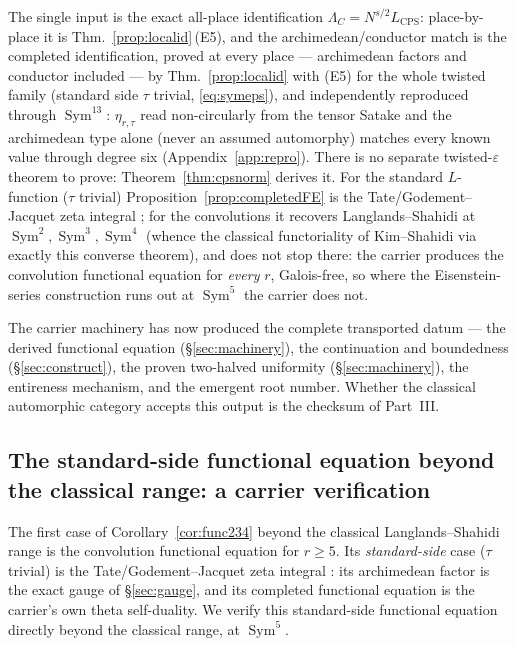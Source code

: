 \documentclass[11pt]{article}
\theoremstyle{definition}
\newcommand{\Sym}{\operatorname{Sym}}
\begin{document}
\noindent The single input is the exact all-place identification $\Lambda_C=N^{s/2}L_{\mathrm{CPS}}$: place-by-place
it is Thm.~\ref{prop:localid}\,(E5), and the archimedean/conductor match is the completed identification, proved
at every place --- archimedean factors and conductor included --- by Thm.~\ref{prop:localid} with (E5) for the
whole twisted family (standard side $\tau$ trivial, \eqref{eq:symeps}), and independently reproduced through
$\Sym^{13}$: $\eta_{r,\tau}$ read non-circularly from the tensor Satake and the archimedean type
alone (never an assumed automorphy) matches every known value through degree six (Appendix~\ref{app:repro}). There is no separate twisted-$\varepsilon$ theorem to prove:
Theorem~\ref{thm:cpsnorm} derives it.
For the standard $L$-function ($\tau$ trivial) Proposition~\ref{prop:completedFE} is the
Tate/Godement--Jacquet zeta integral \cite{Tate,GJa}; for the convolutions it recovers Langlands--Shahidi
\cite{Shahidi} at $\Sym^2,\Sym^3,\Sym^4$ (whence the classical functoriality of Kim--Shahidi
\cite{KimShahidi} via exactly this converse theorem), and does not stop there: the carrier produces the
convolution functional equation for \emph{every} $r$, Galois-free, so where the Eisenstein-series
construction runs out at $\Sym^5$ the carrier does not.

The carrier machinery has now produced the complete transported datum --- the derived functional equation
(\S\ref{sec:machinery}), the continuation and boundedness (\S\ref{sec:construct}), the proven two-halved
uniformity (\S\ref{sec:machinery}), the entireness mechanism, and the emergent root number. Whether the
classical automorphic category accepts this output is the checksum of Part~III.


\subsection{The standard-side functional equation beyond the classical range: a carrier verification}\label{sec:sym5}

The first case of Corollary~\ref{cor:func234} beyond the classical Langlands--Shahidi range is the
convolution functional equation for $r\ge5$. Its
\emph{standard-side} case ($\tau$ trivial) is the Tate/Godement--Jacquet zeta integral \cite{Tate,GJa}:
its archimedean factor is the exact gauge of \S\ref{sec:gauge}, and its completed functional equation is
the carrier's own theta self-duality. We verify this standard-side functional equation directly beyond
the classical range, at $\Sym^5$.
\end{document}
